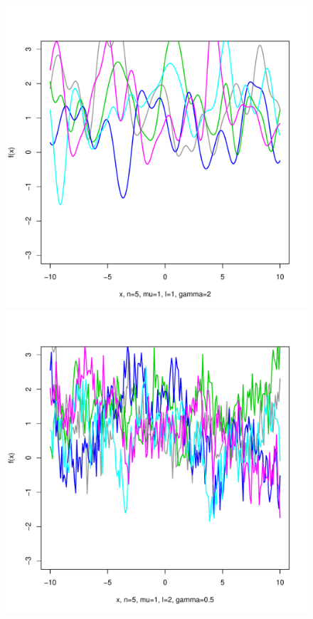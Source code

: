 \documentclass[12pt,letterpaper]{article}
\begin{document}
\begin{figure}
\begin{center}
\includegraphics[scale=0.2]{hw321/n5-m1-l1-g4.pdf}
\includegraphics[scale=0.2]{hw321/n5-m1-l2-g1.pdf}

\end{center}
\end{figure}
\end{document}
